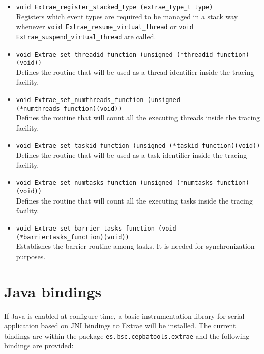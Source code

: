 \begin{itemize}
	\item {\tt void Extrae\_register\_stacked\_type (extrae\_type\_t type)}\\
	Registers which event types are required to be managed in a stack way whenever {\tt void Extrae\_resume\_virtual\_thread} or {\tt void Extrae\_suspend\_virtual\_thread} are called.
	\item {\tt void Extrae\_set\_threadid\_function (unsigned (*threadid\_function)(void))}\\
	Defines the routine that will be used as a thread identifier inside the tracing facility.
	\item {\tt void Extrae\_set\_numthreads\_function (unsigned (*numthreads\_function)(void))}\\
	Defines the routine that will count all the executing threads inside the tracing facility.
	\item {\tt void Extrae\_set\_taskid\_function (unsigned (*taskid\_function)(void))}\\
	Defines the routine that will be used as a task identifier inside the tracing facility.
	\item {\tt void Extrae\_set\_numtasks\_function (unsigned (*numtasks\_function)(void))}\\
	Defines the routine that will count all the executing tasks inside the tracing facility.
	\item {\tt void Extrae\_set\_barrier\_tasks\_function (void (*barriertasks\_function)(void))}\\
	Establishes the barrier routine among tasks. It is needed for synchronization purposes.
\end{itemize}

\section{Java bindings}\label{sec:JavaBindings}

If Java is enabled at configure time, a basic instrumentation library for serial application based on JNI bindings to Extrae will be installed. The current bindings are within the package {\tt es.bsc.cepbatools.extrae} and the following bindings are provided:

